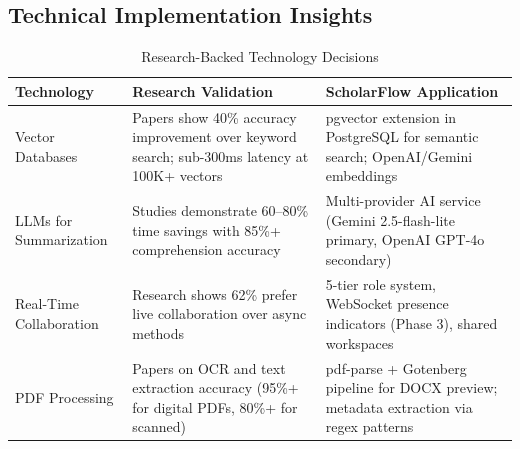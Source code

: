 \subsection{Technical Implementation Insights}

\begin{table}[H]
    \centering
    \small
    \begin{tabular}{|l|p{5cm}|p{6cm}|}
        \hline
        \textbf{Technology}                                                                           & \textbf{Research Validation} & \textbf{ScholarFlow Application} \\
        \hline
        Vector Databases                                                                              &
        Papers show 40\% accuracy improvement over keyword search; sub-300ms latency at 100K+ vectors &
        pgvector extension in PostgreSQL for semantic search; OpenAI/Gemini embeddings                                                                                  \\
        \hline
        LLMs for Summarization                                                                        &
        Studies demonstrate 60--80\% time savings with 85\%+ comprehension accuracy                   &
        Multi-provider AI service (Gemini 2.5-flash-lite primary, OpenAI GPT-4o secondary)                                                                              \\
        \hline
        Real-Time Collaboration                                                                       &
        Research shows 62\% prefer live collaboration over async methods                              &
        5-tier role system, WebSocket presence indicators (Phase 3), shared workspaces                                                                                  \\
        \hline
        PDF Processing                                                                                &
        Papers on OCR and text extraction accuracy (95\%+ for digital PDFs, 80\%+ for scanned)        &
        pdf-parse + Gotenberg pipeline for DOCX preview; metadata extraction via regex patterns                                                                         \\
        \hline
    \end{tabular}
    \caption{Research-Backed Technology Decisions}
    \label{table:research-tech}
\end{table}

